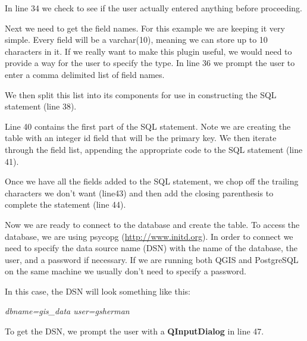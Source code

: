 In line 34 we check to see if the user actually entered anything before proceeding.

Next we need to get the field names.
For this example we are keeping it very simple.
Every field will be a varchar(10), meaning we can store up to 10 characters in it.
If we really want to make this plugin useful, we would need to provide a way for the user to specify the type.
In line 36 we prompt the user to enter a comma delimited list of field names.


We then split this list into its components for use in constructing the SQL statement (line 38).

Line 40 contains the first part of the SQL statement.
Note we are creating the table with an integer id field that will be the primary key.
We then iterate through the field list, appending the appropriate code to the SQL statement (line 41).

Once we have all the fields added to the SQL statement, we chop off the trailing characters we don't want (line43) and then add the closing parenthesis to complete the statement (line 44).

Now we are ready to connect to the database and create the table.
To access the database, we are using psycopg (\url{http://www.initd.org}).
In order to connect we need to specify the data source name (DSN) with the name of the database, the user, and a password if necessary.
If we are running both QGIS and PostgreSQL on the same machine we usually don't need to specify a password.

In this case, the DSN will look something like this:

\begin{center}
  \textsl{dbname=gis\_data user=gsherman}
\end{center}

To get the DSN, we prompt the user with a \textbf{QInputDialog} in line 47.


